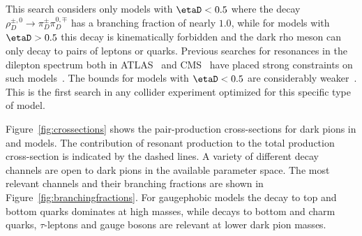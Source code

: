 This search considers only models with $\etaD<0.5$ where the decay $\rho_D^{\pm,0}\rightarrow\pi_D^{\pm}\pi_D^{0,\mp}$ has a branching fraction of nearly $1.0$, while for models with $\etaD>0.5$ this decay is kinematically forbidden and the dark rho meson can only decay to pairs of leptons or quarks.
Previous searches for resonances in the dilepton spectrum both in ATLAS~\cite{EXOT-2016-05} and CMS~\cite{CMS-EXO-16-047} have placed strong constraints on such models~\cite{Kribs:2018ilo}.
The bounds for models with $\etaD<0.5$ are considerably weaker~\cite{Butterworth:2021jto}.
This is the first search in any collider experiment optimized for this specific type of model. %

Figure~\ref{fig:crossections} shows the pair-production cross-sections for dark pions in \sul and \sur models.
The contribution of resonant production to the total production cross-section is indicated by the dashed lines.
A variety of different decay channels are open to dark pions in the available parameter space.
The most relevant channels and their branching fractions are shown in Figure~\ref{fig:branchingfractions}.
For gaugephobic models the decay to top and bottom quarks dominates at high masses, while decays to bottom and charm quarks, $\tau$-leptons and gauge bosons are relevant at lower dark pion masses. 


